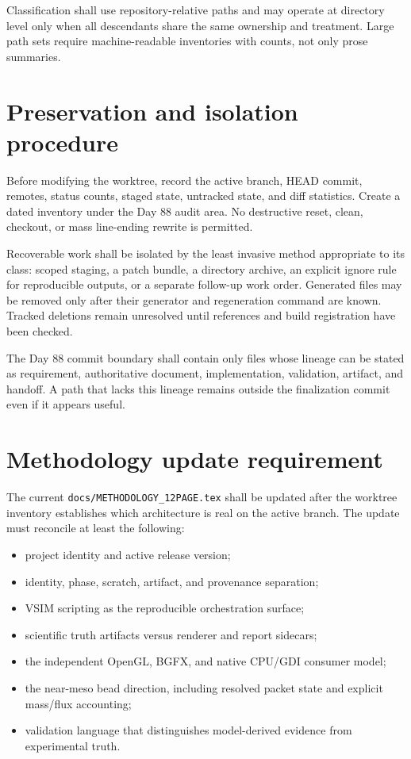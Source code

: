 \documentclass[10pt]{article}
\begin{document}
Classification shall use repository-relative paths and may operate at directory level only when all descendants share the same ownership and treatment. Large path sets require machine-readable inventories with counts, not only prose summaries.

\section*{Preservation and isolation procedure}
Before modifying the worktree, record the active branch, HEAD commit, remotes, status counts, staged state, untracked state, and diff statistics. Create a dated inventory under the Day 88 audit area. No destructive reset, clean, checkout, or mass line-ending rewrite is permitted.

Recoverable work shall be isolated by the least invasive method appropriate to its class: scoped staging, a patch bundle, a directory archive, an explicit ignore rule for reproducible outputs, or a separate follow-up work order. Generated files may be removed only after their generator and regeneration command are known. Tracked deletions remain unresolved until references and build registration have been checked.

The Day 88 commit boundary shall contain only files whose lineage can be stated as requirement, authoritative document, implementation, validation, artifact, and handoff. A path that lacks this lineage remains outside the finalization commit even if it appears useful.

\newpage
\section*{Methodology update requirement}
The current \texttt{docs/METHODOLOGY\_12PAGE.tex} shall be updated after the worktree inventory establishes which architecture is real on the active branch. The update must reconcile at least the following:

\begin{itemize}
\item project identity and active release version;
\item identity, phase, scratch, artifact, and provenance separation;
\item VSIM scripting as the reproducible orchestration surface;
\item scientific truth artifacts versus renderer and report sidecars;
\item the independent OpenGL, BGFX, and native CPU/GDI consumer model;
\item the near-meso bead direction, including resolved packet state and explicit mass/flux accounting;
\item validation language that distinguishes model-derived evidence from experimental truth.
\end{itemize}
\end{document}
